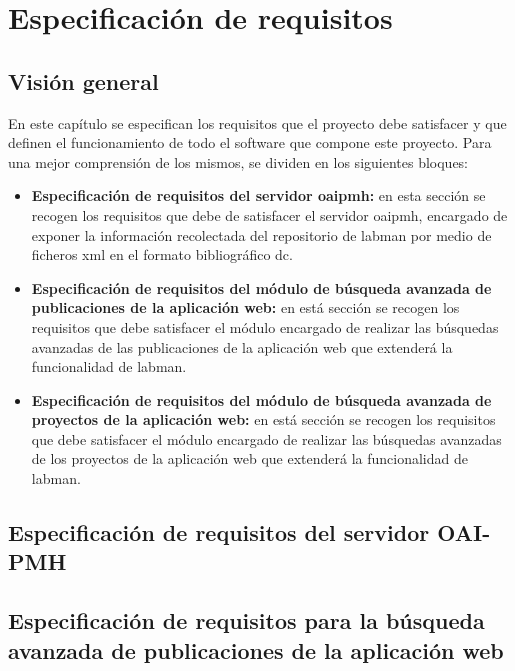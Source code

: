 \chapter{Especificación de requisitos}

\section{Visión general}

En este capítulo se especifican los requisitos que el proyecto debe satisfacer y que definen el funcionamiento de todo el software que compone este proyecto. Para una mejor comprensión de los mismos, se dividen en los siguientes bloques:

\begin{itemize}
	\item \textbf{Especificación de requisitos del servidor \acrshort{oaipmh}:} en esta sección se recogen los requisitos que debe de satisfacer el servidor \acrshort{oaipmh}, encargado de exponer la información recolectada del repositorio de \acrshort{labman} por medio de ficheros \acrshort{xml} en el formato bibliográfico \acrshort{dc}.

	\item \textbf{Especificación de requisitos del módulo de búsqueda avanzada de publicaciones de la aplicación web:} en está sección se recogen los requisitos que debe satisfacer el módulo encargado de realizar las búsquedas avanzadas de las publicaciones de la aplicación web que extenderá la funcionalidad de \acrshort{labman}.

	\item \textbf{Especificación de requisitos del módulo de búsqueda avanzada de proyectos de la aplicación web:} en está sección se recogen los requisitos que debe satisfacer el módulo encargado de realizar las búsquedas avanzadas de los proyectos de la aplicación web que extenderá la funcionalidad de \acrshort{labman}.
\end{itemize}

\section{Especificación de requisitos del servidor OAI-PMH}

\section{Especificación de requisitos para la búsqueda avanzada de publicaciones de la aplicación web}

